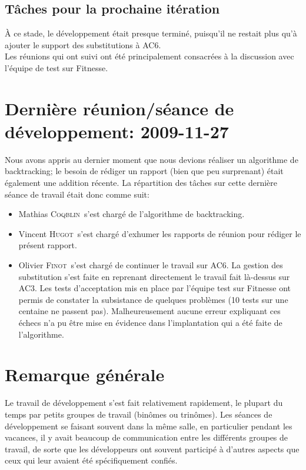 \documentclass[a4paper,12pt]{article}
\def\familyname{\textsc}
\def\firstname#1{#1}
\def\groupmember#1#2{\firstname{#1} \familyname{#2}}
\def\mmat{\groupmember{Mathias}{Coqblin}}
\def\moli{\groupmember{Olivier}{Finot}}
\def\mvin{\groupmember{Vincent}{Hugot}}
\begin{document}
\subsection{Tâches pour la prochaine itération}

\`A ce stade, le développement était presque terminé, puisqu'il
 ne restait plus qu'à ajouter le support des substitutions à AC6.\mk\\
%
Les réunions qui ont suivi ont été principalement consacrées à
la discussion avec l'équipe de test sur Fitnesse.


\section{Dernière réunion/séance de développement: 2009-11-27}

Nous avons appris au dernier moment que nous devions réaliser 
un algorithme de backtracking; le besoin de rédiger un rapport
(bien que peu surprenant) était également une addition récente.
La répartition des tâches sur cette dernière séance de 
travail était donc comme suit: 
\begin{itemize}
 \item \mmat\ s'est chargé de l'algorithme de backtracking.
\item \mvin\ s'est chargé d'exhumer les rapports de réunion pour
rédiger le présent rapport.
\item \moli\ s'est chargé de continuer le travail sur AC6.
La gestion des substitution s'est faite en reprenant directement le travail fait là-dessus sur AC3.
Les tests d'acceptation mis en place par l'équipe test sur Fitnesse ont permis de constater la subsistance de quelques problèmes (10 tests sur une centaine ne passent pas).
Malheureusement aucune erreur expliquant ces échecs n'a pu être mise en évidence dans l'implantation qui a été faite de l'algorithme.
\end{itemize}

\section{Remarque générale}

Le travail de développement s'est fait relativement rapidement, 
le plupart du temps par petits groupes de travail (binômes ou trinômes).
Les séances de développement se faisant souvent dans la même salle,
en particulier pendant les vacances,
il y avait beaucoup de communication entre les différents groupes de travail,
de sorte que les développeurs ont souvent 
participé à d'autres aspects que ceux qui leur avaient été spécifiquement
confiés.
\end{document}

